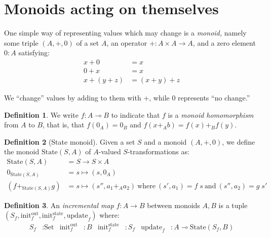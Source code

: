 \documentclass{article}
\theoremstyle{definition}
\newtheorem{definition}{Definition}
\theoremstyle{remark}
\newcommand\<\;                 %
\newcommand\init{\text{init}}
\newcommand\update{\text{update}}
\newcommand\Set{\text{Set}}
\newcommand\State{\text{State}}
\newcommand\lto\multimap
\begin{document}
\section{Monoids acting on themselves}

One simple way of representing values which may change is a \emph{monoid,} namely some triple $(A,+,0)$ of a set $A$, an operator ${+} : A \times A \to A$, and a zero element $0 : A$ satisfying:
%
\begin{align*}
  x + 0 &= x\\
  0 + x &= x\\
  x + (y + z) &= (x + y) + z
\end{align*}

\noindent
We ``change'' values by adding to them with $+$, while $0$ represents ``no change.''

\begin{definition}
  We write $f : A \lto B$ to indicate that $f$ is a \emph{monoid homomorphism} from $A$ to $B$, that is, that $f(0_A) = 0_B$ and $f(x +_A b) = f(x) +_B f(y)$.
\end{definition}

\begin{definition}[State monoid]
  Given a set $S$ and a monoid $(A,+,0)$, we define the monoid $\State(S,A)$ of $A$-valued $S$-transformations as:
%
  \begin{align*}
    \State(S,A) &= S \to S \times A\\
    0_{\State(S,A)} &= s \mapsto (s, 0_A)\\
    (f +_{\State(S,A)} g) &= s \mapsto (s'', a_1 +_A a_2)
    ~\text{where}~ (s', a_1) = f\<s ~\text{and}~ (s'', a_2) = g\<s'
  \end{align*}
\end{definition}

\newcommand\initout{\init^{\text{out}}}
\newcommand\initstate{\init^{\text{state}}}

\begin{definition}
  An \emph{incremental map} $f : A \to B$ between monoids $A, B$ is a tuple $(S_f, \initout_f, \initstate_f, \update_f)$ where:
  \begin{align*}
    S_f &: \Set
    &
    \initout_f &: B
    &
    \initstate_f &: S_f
    &
    \update_f &: A \lto \State({S_f}, B)
  \end{align*}
\end{definition}
\end{document}
